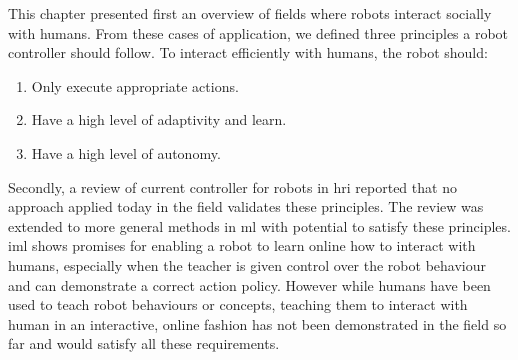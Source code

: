 This chapter presented first an overview of fields where robots interact socially with humans. From these cases of application, we defined three principles a robot controller should follow. To interact efficiently with humans, the robot should:
\begin{enumerate}
   	\item Only execute appropriate actions.
   	\item Have a high level of adaptivity and learn.
   	\item Have a high level of autonomy.
\end{enumerate}

Secondly, a review of current controller for robots in \gls{hri} reported that no approach applied today in the field validates these principles. The review was extended to more general methods in \acrlong{ml} with potential to satisfy these principles. \acrlong{iml} shows promises for enabling a robot to learn online how to interact with humans, especially when the teacher is given control over the robot behaviour and can demonstrate a correct action policy. However while humans have been used to teach robot behaviours or concepts, teaching them to interact with human in an interactive, online fashion has not been demonstrated in the field so far and would satisfy all these requirements.